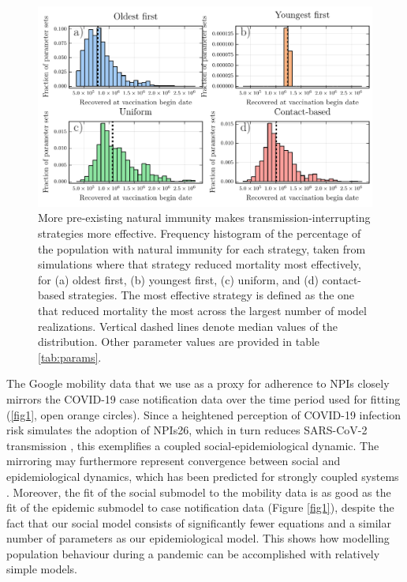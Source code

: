 \begin{figure}
  \includegraphics[width=\textwidth]{chapter_1/histograms.pdf}  
\caption{More pre-existing natural immunity makes transmission-interrupting strategies more effective. Frequency histogram of the percentage of the population with natural immunity for each strategy, taken from simulations where that strategy reduced mortality most effectively, for (a) oldest first, (b) youngest first, (c) uniform, and (d) contact-based strategies. The most effective strategy is defined as the one that reduced mortality the most across the largest number of model realizations. Vertical dashed lines denote median values of the distribution. Other parameter values are provided in table \ref{tab:params}.}
\label{fig6}
\end{figure}
The Google mobility data that we use as a proxy for adherence to NPIs closely mirrors the COVID-19 case notification data over the time period used for fitting (\ref{fig1}, open orange circles).  Since a heightened perception of COVID-19 infection risk simulates the adoption of NPIs26, which in turn reduces SARS-CoV-2 transmission \cite{anderson2020estimating,peak2020individual}, this exemplifies a coupled  social-epidemiological dynamic.  The mirroring may furthermore represent convergence between social and epidemiological dynamics, which has been predicted for strongly coupled systems \cite{sigdel2019convergence}. Moreover, the fit of the social submodel to the mobility data is as good as the fit of the epidemic submodel to case notification data (Figure \ref{fig1}), despite the fact that our social model consists of significantly fewer equations and a similar number of parameters as our epidemiological model. This shows how modelling population behaviour during a pandemic can be accomplished with relatively simple models. 

